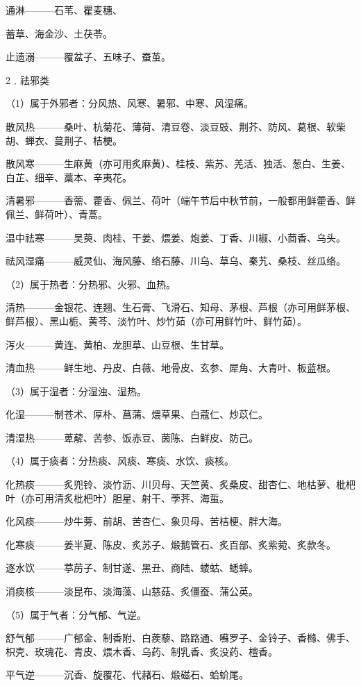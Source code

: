 \documentclass[a4paper,12pt,UTF8,twoside]{ctexbook}
\begin{document}
通淋———石苇、瞿麦穗、

蓄草、海金沙、土茯苓。

止遗溺———覆盆子、五味子、蚕茧。

2﹒祛邪类

（1）属于外邪者：分风热、风寒、暑邪、中寒、风湿痛。

散风热———桑叶、杭菊花、薄荷、清豆卷、淡豆豉、荆芥、防风、葛根、软柴胡、蝉衣、蔓荆子、桔梗。

散风寒———生麻黄（亦可用炙麻黄）、桂枝、紫苏、羌活、独活、葱白、生姜、白芷、细辛、藁本、辛夷花。

清暑邪———香薷、藿香、佩兰、荷叶（端午节后中秋节前，一般都用鲜藿香、鲜佩兰、鲜荷叶）、青蒿。

温中祛寒———吴萸、肉桂、干姜、煨姜、炮姜、丁香、川椒、小茴香、乌头。

祛风湿痛———威灵仙、海风藤、络石藤、川乌、草乌、秦艽、桑枝、丝瓜络。

（2）属于热者：分热邪、火邪、血热。

清热———金银花、连翘、生石膏、飞滑石、知母、茅根、芦根（亦可用鲜茅根、鲜芦根）、黑山栀、黄芩、淡竹叶、炒竹茹（亦可用鲜竹叶、鲜竹茹）。

泻火———黄连、黄柏、龙胆草、山豆根、生甘草。

清血热———鲜生地、丹皮、白薇、地骨皮、玄参、犀角、大青叶、板蓝根。

（3）属于湿者：分湿浊、湿热。

化湿———制苍术、厚朴、菖蒲、煨草果、白蔻仁、炒苡仁。

清湿热———萆薢、苦参、饭赤豆、茵陈、白鲜皮、防己。

（4）属于痰者：分热痰、风痰、寒痰、水饮、痰核。

化热痰———炙兜铃、淡竹沥、川贝母、天竺黄、炙桑皮、甜杏仁、地枯萝、枇杷叶（亦可用清炙枇杷叶）胆星、射干、荸荠、海蜇。

化风痰———炒牛蒡、前胡、苦杏仁、象贝母、苦桔梗、胖大海。

化寒痰———姜半夏、陈皮、炙苏子、煅鹅管石、炙百部、炙紫菀、炙款冬。

逐水饮———葶苈子、制甘遂、黑丑、商陆、蝼蛄、蟋蟀。

消痰核———淡昆布、淡海藻、山慈菇、炙僵蚕、蒲公英。

（5）属于气者：分气郁、气逆。

舒气郁———广郁金、制香附、白蒺藜、路路通、囌罗子、金铃子、香橼、佛手、枳壳、玫瑰花、青皮、煨木香、乌药、制乳香、炙没药、檀香。

平气逆———沉香、旋覆花、代赭石、煅磁石、蛤蚧尾。
\end{document}
